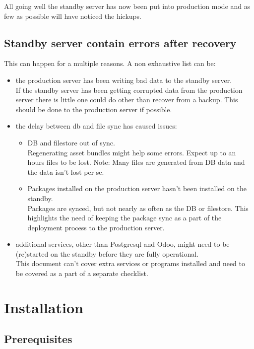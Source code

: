 \documentclass[a4paper]{article}
\begin{document}
	All going well the standby server has now been put into production mode and as few as possible will have noticed the hickups.

\subsection{Standby server contain errors after recovery}
	This can happen for a multiple reasons. A non exhaustive list can be:
	\begin{itemize}
		\item the production server has been writing bad data to the standby server.\\
				If the standby server has been getting corrupted data from the production server there is little one could do other than recover from a backup. This should be done to the production server if possible.
		\item the delay between db and file sync has caused issues:
		\begin{itemize}
			\item DB and filestore out of sync.\\
				Regenerating asset bundles might help some errors. Expect up to an hours files to be lost. Note: Many files are generated from DB data and the data isn't lost per se.
			\item Packages installed on the production server hasn't been installed on the standby.\\Packages are synced, but not  nearly as often as the DB or filestore. This highlights the need of keeping the package sync as a part of the deployment process to the production server.
		\end{itemize}
		\item additional services, other than Postgresql and Odoo, might need to be (re)started on the standby before they are fully operational.\\
			This document can't cover extra services or programs installed and need to be covered as a part of a separate checklist. 
	\end{itemize}

\newpage
\section{Installation}
	
\subsection{Prerequisites}
\end{document}
